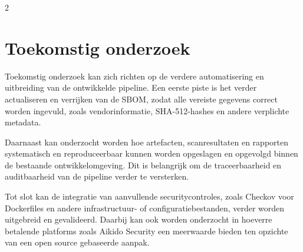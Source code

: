 \documentclass[a0,portrait]{hogent-poster}
\begin{document}
\begin{multicols}{2}
\section{Toekomstig onderzoek}

Toekomstig onderzoek kan zich richten op de verdere automatisering en uitbreiding van de ontwikkelde pipeline. Een eerste piste is het verder actualiseren en verrijken van de SBOM, zodat alle vereiste gegevens correct worden ingevuld, zoals vendorinformatie, SHA-512-hashes en andere verplichte metadata.

Daarnaast kan onderzocht worden hoe artefacten, scanresultaten en rapporten systematisch en reproduceerbaar kunnen worden opgeslagen en opgevolgd binnen de bestaande ontwikkelomgeving. Dit is belangrijk om de traceerbaarheid en auditbaarheid van de pipeline verder te versterken.

Tot slot kan de integratie van aanvullende securitycontroles, zoals Checkov voor Dockerfiles en andere infrastructuur- of configuratiebestanden, verder worden uitgebreid en gevalideerd. Daarbij kan ook worden onderzocht in hoeverre betalende platforms zoals Aikido Security een meerwaarde bieden ten opzichte van een open source gebaseerde aanpak.

\end{multicols}
\end{document}

